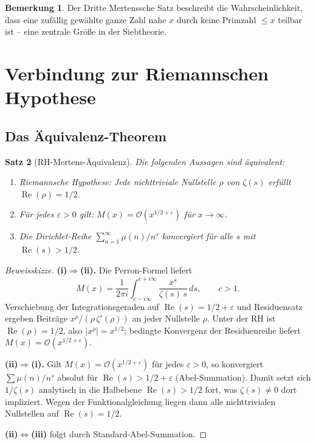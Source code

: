 \documentclass[12pt,a4paper]{amsart}
\newtheorem{theorem}{Satz}[section]
\theoremstyle{definition}
\newtheorem{bemerkung}[theorem]{Bemerkung}
\newcommand{\BigO}{\mathcal{O}}
\begin{document}
\begin{bemerkung}
Der Dritte Mertenssche Satz beschreibt die Wahrscheinlichkeit, dass eine
zufällig gewählte ganze Zahl nahe $x$ durch keine Primzahl $\le x$ teilbar
ist – eine zentrale Größe in der Siebtheorie.
\end{bemerkung}

\section{Verbindung zur Riemannschen Hypothese}
\label{sec:rh}

\subsection{Das Äquivalenz-Theorem}

\begin{theorem}[RH-Mertens-Äquivalenz]
\label{satz:rh-aequiv}
Die folgenden Aussagen sind äquivalent:
\begin{enumerate}[label=(\roman*)]
  \item \emph{Riemannsche Hypothese}: Jede nichttriviale Nullstelle $\rho$ von
        $\zeta(s)$ erfüllt $\operatorname{Re}(\rho) = 1/2$.
  \item Für jedes $\varepsilon > 0$ gilt: $M(x) = \BigO(x^{1/2+\varepsilon})$
        für $x \to \infty$.
  \item Die Dirichlet-Reihe $\sum_{n=1}^{\infty}\mu(n)/n^s$ konvergiert für
        alle $s$ mit $\operatorname{Re}(s) > 1/2$.
\end{enumerate}
\end{theorem}

\begin{proof}[Beweisskizze]
\textbf{(i)$\Rightarrow$(ii).}
Die Perron-Formel liefert
\[
  M(x) = \frac{1}{2\pi i}\int_{c-i\infty}^{c+i\infty}
          \frac{x^s}{\zeta(s)\,s}\,ds, \qquad c > 1.
\]
Verschiebung der Integrationsgeraden auf $\operatorname{Re}(s) = 1/2+\varepsilon$
und Residuensatz ergeben Beiträge $x^{\rho}/(\rho\,\zeta'(\rho))$ an jeder
Nullstelle $\rho$.  Unter der RH ist $\operatorname{Re}(\rho)=1/2$, also
$|x^{\rho}| = x^{1/2}$; bedingte Konvergenz der Residuenreihe liefert
$M(x) = \BigO(x^{1/2+\varepsilon})$.

\textbf{(ii)$\Rightarrow$(i).}
Gilt $M(x) = \BigO(x^{1/2+\varepsilon})$ für jedes $\varepsilon > 0$, so
konvergiert $\sum\mu(n)/n^s$ absolut für $\operatorname{Re}(s)>1/2+\varepsilon$
(Abel-Summation).  Damit setzt sich $1/\zeta(s)$ analytisch in die Halbebene
$\operatorname{Re}(s)>1/2$ fort, was $\zeta(s)\ne 0$ dort impliziert.  Wegen
der Funktionalgleichung liegen dann alle nichttrivialen Nullstellen auf
$\operatorname{Re}(s)=1/2$.

\textbf{(ii)$\Leftrightarrow$(iii)} folgt durch Standard-Abel-Summation.
\end{proof}
\end{document}
